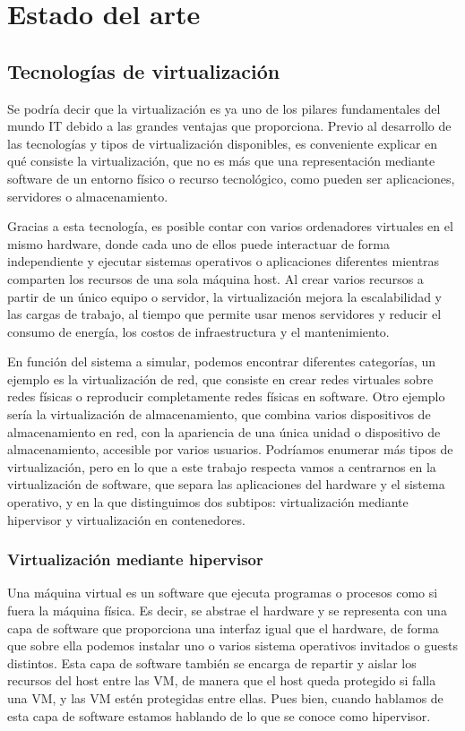 \chapter{Estado del arte}
\section{Tecnologías de virtualización}
Se podría decir que la virtualización es ya uno de los pilares fundamentales del mundo IT debido a las grandes ventajas que proporciona. Previo al desarrollo de las tecnologías y tipos de virtualización disponibles, es conveniente explicar en qué consiste la virtualización, que no es más que una representación mediante software de un entorno físico o recurso tecnológico, como pueden ser aplicaciones, servidores o almacenamiento. 

Gracias a esta tecnología, es posible contar con varios ordenadores virtuales en el mismo hardware, donde cada uno de ellos puede interactuar de forma independiente y ejecutar sistemas operativos o aplicaciones diferentes mientras comparten los recursos de una sola máquina host. Al crear varios recursos a partir de un único equipo o servidor, la virtualización mejora la escalabilidad y las cargas de trabajo, al tiempo que permite usar menos servidores y reducir el consumo de energía, los costos de infraestructura y el mantenimiento.

En función del sistema a simular, podemos encontrar diferentes categorías, un ejemplo es la virtualización de red, que consiste en crear redes virtuales sobre redes físicas o reproducir completamente redes físicas en software. Otro ejemplo sería la virtualización de almacenamiento, que combina varios dispositivos de almacenamiento en red, con la apariencia de una única unidad o dispositivo de almacenamiento, accesible por varios usuarios. Podríamos enumerar más tipos de virtualización, pero en lo que a este trabajo respecta vamos a centrarnos en la virtualización de software, que separa las aplicaciones del hardware y el sistema operativo, y en la que distinguimos dos subtipos: virtualización mediante hipervisor y virtualización en contenedores.

\subsection{Virtualización mediante hipervisor}
Una máquina virtual es un software que ejecuta programas o procesos como si fuera la máquina física. Es decir, se abstrae el hardware y se representa con una capa de software que proporciona una interfaz igual que el hardware, de forma que sobre ella podemos instalar uno o varios sistema operativos invitados o guests distintos. Esta capa de software también se encarga de repartir y aislar los recursos del host entre las VM, de manera que el host queda protegido si falla una VM, y las VM estén protegidas entre ellas. Pues bien, cuando hablamos de esta capa de software estamos hablando de lo que se conoce como hipervisor. 

